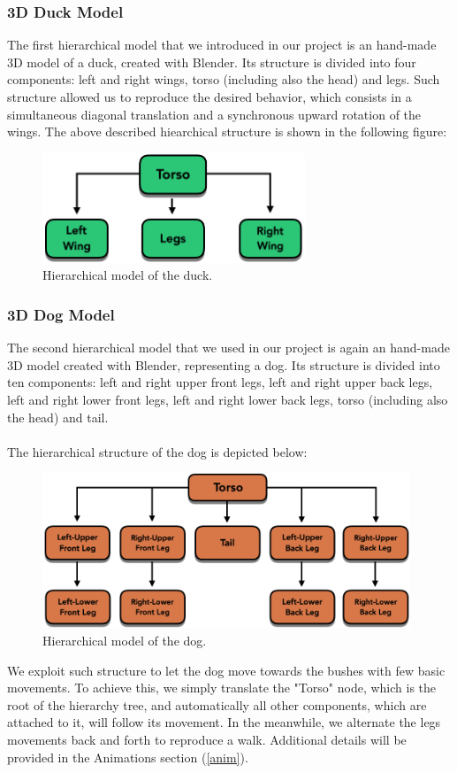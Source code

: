 \documentclass[12pt,a4paper]{article}
\begin{document}
\subsubsection{3D Duck Model}
The first hierarchical model that we introduced in our project is an hand-made 3D model of a duck, created with Blender. Its structure is divided into four components: left and right wings, torso (including also the head) and legs. Such structure allowed us to reproduce the desired behavior, which consists in a simultaneous diagonal translation and a synchronous upward rotation of the wings. The above described hiearchical structure is shown in the following figure:
\begin{figure}[hbt!]
	\centering
	\includegraphics[width=0.7\textwidth]{hier_duck}
	\caption{Hierarchical model of the duck.}
	\label{fig2}
\end{figure}

\subsubsection{3D Dog Model}
The second hierarchical model that we used in our project is again an hand-made 3D model created with Blender, representing a dog. Its structure is divided into ten components: left and right upper front legs, left and right upper back legs, left and right lower front legs, left and right lower back legs, torso (including also the head) and tail. 
\\\\The hierarchical structure of the dog is depicted below: 
\begin{figure}[hbt!]
	\centering
	\includegraphics[width=0.98\textwidth]{hier_dog}
	\caption{Hierarchical model of the dog.}
	\label{fig3}
\end{figure}
\hfill \break We exploit such structure to let the dog move towards the bushes with few basic movements. To achieve this, we simply translate the "Torso" node, which is the root of the hierarchy tree, and automatically all other components, which are attached to it, will follow its movement. In the meanwhile, we alternate the legs movements back and forth to reproduce a walk. Additional details will be provided in the Animations section (\ref{anim}).
\end{document}
